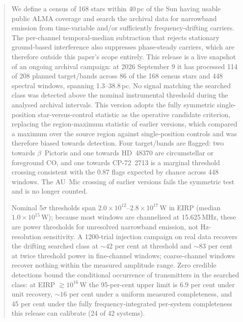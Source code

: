 \documentclass{openjournal}
\begin{document}
\begin{abstract}
We define a census of 168 stars within 40\,pc of the Sun having usable
public ALMA coverage and search the archival data for narrowband
emission from time-variable and/or sufficiently frequency-drifting
carriers. The per-channel temporal-median subtraction that rejects
stationary ground-based interference also suppresses phase-steady
carriers, which are therefore outside this paper's scope entirely.
This release is a live snapshot of an ongoing archival campaign: at
2026 September 9 it has processed 114 of 208 planned target/bands
across 86 of the 168 census stars and 448 spectral windows, spanning
1.3--38.8\,pc. No signal matching the searched class was detected above
the nominal instrumental threshold during the analysed archival
intervals. This version adopts the fully symmetric single-position
star-versus-control statistic as the operative candidate criterion,
replacing the region-maximum statistic of earlier versions, which
compared a maximum over the source region against single-position
controls and was therefore biased towards detection. Four target/bands
are flagged: two towards $\beta$~Pictoris and one towards HD~48370 are
circumstellar or foreground CO, and one towards CP-72~2713 is a
marginal threshold crossing consistent with the 0.87 flags expected by
chance across 448 windows. The AU~Mic crossing of earlier versions
fails the symmetric test and is no longer counted.

Nominal 5$\sigma$ thresholds span $2.0\times10^{12}$--$2.8\times
10^{17}$\,W in EIRP (median $1.0\times10^{15}$\,W); because most windows are channelised at
15.625\,MHz, these are power thresholds for unresolved narrowband
emission, not Hz-resolution sensitivity. A 1200-trial injection
campaign on real data recovers the drifting searched class at
${\sim}42$ per cent at threshold and ${\sim}83$ per cent at twice
threshold power in fine-channel windows; coarse-channel windows
recover nothing within the measured amplitude range. Zero credible
detections bound the conditional occurrence of transmitters in the
searched class: at EIRP $\gtrsim 10^{16}$\,W the 95-per-cent upper
limit is 6.9 per cent under unit recovery, ${\sim}16$ per cent under
a uniform measured completeness, and 45 per cent under the fully
frequency-integrated per-system completeness this release can
calibrate (24 of 42 systems).
\end{abstract}

\end{document}
